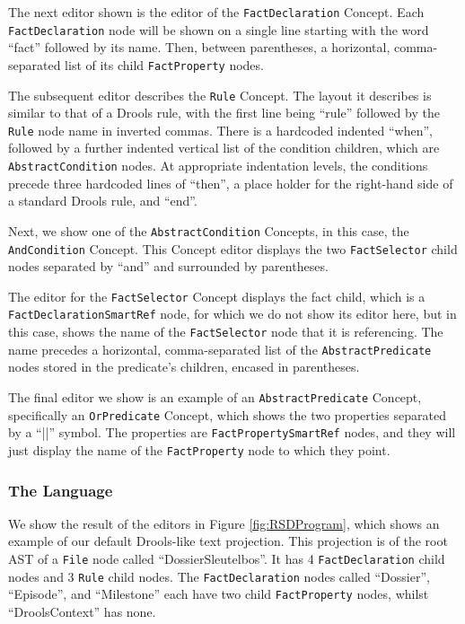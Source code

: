 The next editor shown is the editor of the \texttt{FactDeclaration} Concept.
Each \texttt{FactDeclaration} node will be shown on a single line starting with the word ``fact'' followed by its name.
Then, between parentheses, a horizontal, comma-separated list of its child \texttt{FactProperty} nodes.

The subsequent editor describes the \texttt{Rule} Concept. 
The layout it describes is similar to that of a Drools rule, with the first line being ``rule'' followed by the \texttt{Rule} node name in inverted commas.
There is a hardcoded indented ``when'', followed by a further indented vertical list of the condition children, which are \linebreak\texttt{AbstractCondition} nodes.
At appropriate indentation levels, the conditions precede three hardcoded lines of ``then'', a place holder for the right-hand side of a standard Drools rule, and ``end''.

Next, we show one of the \texttt{AbstractCondition} Concepts, in this case, the \texttt{AndCondition} Concept.
This Concept editor displays the two \texttt{FactSelector} child nodes separated by ``and'' and surrounded by parentheses.

The editor for the \texttt{FactSelector} Concept displays the fact child, which is a \texttt{FactDeclarationSmartRef} node, for which we do not show its editor here, but in this case, shows the name of the \texttt{FactSelector} node that it is referencing.
The name precedes a horizontal, comma-separated list of the \texttt{AbstractPredicate} nodes stored in the predicate's children, encased in parentheses.

The final editor we show is an example of an \texttt{AbstractPredicate} Concept, specifically an \texttt{OrPredicate} Concept, which shows the two properties separated by a ``||'' symbol.
The properties are \texttt{FactPropertySmartRef} nodes, and they will just display the name of the \texttt{FactProperty} node to which they point.

\subsubsection{The Language}
We show the result of the editors in Figure \ref{fig:RSDProgram}, which shows an example of our default Drools-like text projection. 
This projection is of the root AST of a \texttt{File} node called ``DossierSleutelbos''.
It has 4 \texttt{FactDeclaration} child nodes and 3 \texttt{Rule} child nodes.
The \texttt{FactDeclaration} nodes called ``Dossier'', ``Episode'', and ``Milestone'' each have two child \texttt{FactProperty} nodes, whilst ``DroolsContext'' has none.

